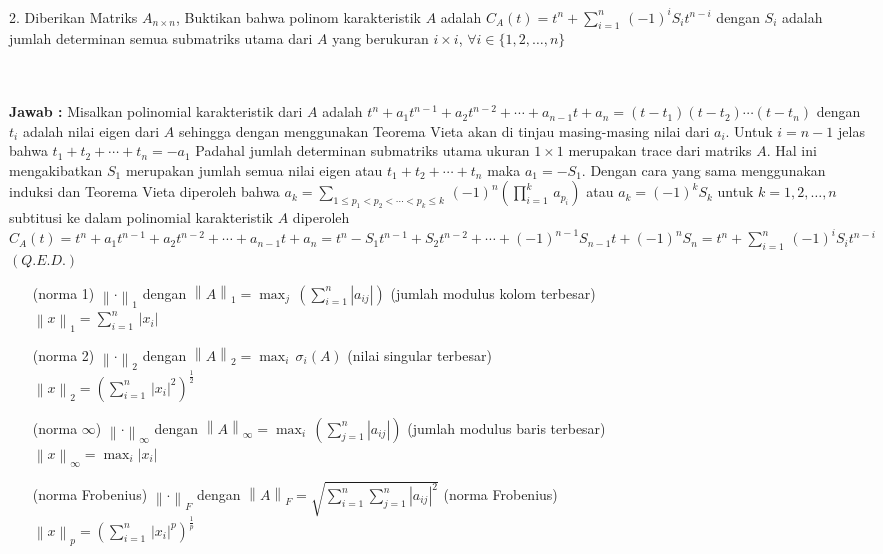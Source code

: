 \documentclass[11pt,a4paper]{article}
\newcommand{\ds}{\displaystyle}
\theoremstyle{plain}
\theoremstyle{definition}
\theoremstyle{remark}
\begin{document}
\begin{enumerate}
\begin{enumerate}
	\- \\ \- \\
	\textbf{Jawab :} Misalkan polinomial karakteristik dari $A$ adalah $t^{n}+a_{1}t^{n-1}+a_{2}t^{n-2}+\cdots +a_{n-1}t+a_{n}=(t-t_{1})(t-t_{2})\cdots (t-t_{n})$ dengan $t_{i}$ adalah nilai eigen dari $A$ sehingga dengan menggunakan Teorema Vieta akan di tinjau masing-masing nilai dari $a_{i}$. Untuk $i=n-1$ jelas bahwa $t_{1}+t_{2}+\cdots +t_{n} = -a_{1}$ Padahal jumlah determinan submatriks utama ukuran $1\times 1$ merupakan trace dari matriks $A$. Hal ini mengakibatkan $S_{1}$ merupakan jumlah semua nilai eigen atau $t_{1}+t_{2}+\cdots +t_{n}$ maka $a_{1} = -S_{1}$. Dengan cara yang sama menggunakan induksi dan Teorema Vieta diperoleh bahwa $a_{k} = \ds \sum_{1\le p_{1}< p_{2}<\cdots <p_{k}\le k}\, (-1)^{n} \left( \prod_{i=1}^{k}\, a_{p_{i}}\right)  $ atau $a_{k}=(-1)^{k}S_{k}$ untuk $k=1,2,\ldots ,n$ subtitusi ke dalam polinomial karakteristik $A$ diperoleh $C_{A}(t) = t^{n}+a_{1}t^{n-1}+a_{2}t^{n-2}+\cdots +a_{n-1}t+a_{n} = t^{n}-S_{1}t^{n-1}+S_{2}t^{n-2}+\cdots +(-1)^{n-1}S_{n-1}t+(-1)^{n}S_{n} = t^{n}+\sum_{i=1}^{n}\, (-1)^{i}S_{i}t^{n-i}$ $(Q.E.D.)$
	
	
\end{enumerate}
	
		
\newpage

	\begin{enumerate}
		\item[(norma 1)] $\left\| \cdot \right\|_{1}$ dengan $\left\| A \right\|_{1}=\ds \max_{j}\, \left( \sum_{i=1}^{n} \left| a_{ij}\right| \right)$ (jumlah modulus kolom terbesar)\\
		$\left\| x \right\|_{1}=\ds \sum_{i=1}^{n}\, \left| x_{i}\right|$
		\item[(norma 2)] $\left\| \cdot \right\|_{2}$ dengan $\left\| A \right\|_{2}=\ds \max_{i}\, \sigma_{i}\left( A\right)$ (nilai singular terbesar) \\
		$\left\| x \right\|_{2}=\ds \left( \sum_{i=1}^{n}\, \left| x_{i}\right|^{2} \right)^{\frac{1}{2}}$
		\item[(norma $\infty$)] $\left\| \cdot \right\|_{\infty}$ dengan $\left\| A \right\|_{\infty}=\ds \max_{i}\, \left( \sum_{j=1}^{n} | a_{ij}| \right)$ (jumlah modulus baris terbesar)\\
		$\left\| x \right\|_{\infty}=\ds \max_{i} \left| x_{i}\right|$
		\item[(norma Frobenius)] $\left\| \cdot \right\|_{F}$ dengan $\left\| A \right\|_{F}=\ds \sqrt{\sum_{i=1}^{n} \sum_{j=1}^{n} \left| a_{ij}\right|^{2}}$ (norma Frobenius)\\
		$\left\| x \right\|_{p}=\ds \left( \sum_{i=1}^{n}\, \left| x_{i}\right|^{p} \right)^{\frac{1}{p}}$
	\end{enumerate}
	


\end{enumerate}
\end{document}
